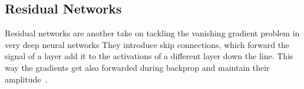 \subsection{Residual Networks}
Residual networks are another take on tackling the vanishing gradient problem in very deep neural networks 
They introduce skip connections, which forward the signal of a layer add it to the activations of a different layer down the line.
This way the gradients get also forwarded during backprop and maintain their amplitude~\cite{res_net}.

